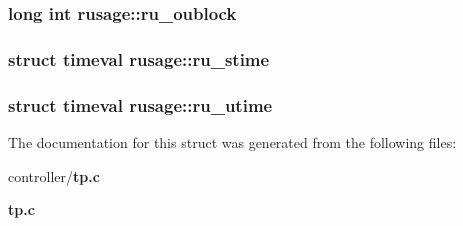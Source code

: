 \subsubsection[{ru\_\-oublock}]{\setlength{\rightskip}{0pt plus 5cm}long int {\bf rusage::ru\_\-oublock}}\label{structrusage_a002b02662ae53d05b1cd62c641969fa8}
\subsubsection[{ru\_\-stime}]{\setlength{\rightskip}{0pt plus 5cm}struct {\bf timeval} {\bf rusage::ru\_\-stime}}\label{structrusage_a7776ee7a6ec11f32ad4c8d1b0862ceb8}
\subsubsection[{ru\_\-utime}]{\setlength{\rightskip}{0pt plus 5cm}struct {\bf timeval} {\bf rusage::ru\_\-utime}}\label{structrusage_a42c294483743ea16b9a77f22a2e7660a}


The documentation for this struct was generated from the following files:\begin{DoxyCompactItemize}
\item 
controller/{\bf tp.c}\item 
{\bf tp.c}\end{DoxyCompactItemize}
